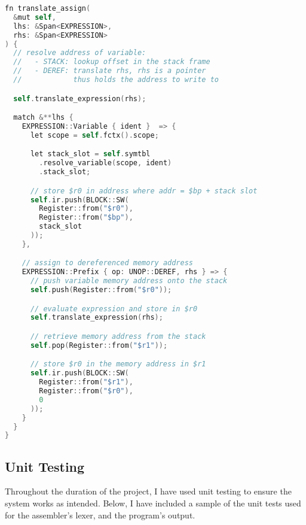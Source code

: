 \begin{lstlisting}[language=C]
fn translate_assign(
  &mut self, 
  lhs: &Span<EXPRESSION>, 
  rhs: &Span<EXPRESSION>
) {
  // resolve address of variable:
  //   - STACK: lookup offset in the stack frame
  //   - DEREF: translate rhs, rhs is a pointer 
  //            thus holds the address to write to

  self.translate_expression(rhs);

  match &**lhs {
    EXPRESSION::Variable { ident }  => {
      let scope = self.fctx().scope;

      let stack_slot = self.symtbl
        .resolve_variable(scope, ident)
        .stack_slot;

      // store $r0 in address where addr = $bp + stack slot
      self.ir.push(BLOCK::SW(
        Register::from("$r0"), 
        Register::from("$bp"), 
        stack_slot
      ));
    },

    // assign to dereferenced memory address
    EXPRESSION::Prefix { op: UNOP::DEREF, rhs } => {
      // push variable memory address onto the stack 
      self.push(Register::from("$r0"));

      // evaluate expression and store in $r0
      self.translate_expression(rhs);

      // retrieve memory address from the stack
      self.pop(Register::from("$r1"));

      // store $r0 in the memory address in $r1
      self.ir.push(BLOCK::SW(
        Register::from("$r1"),
        Register::from("$r0"), 
        0
      ));
    }
  }
}
\end{lstlisting}

\subsection{Unit Testing}
Throughout the duration of the project, I have used unit testing to ensure the system works as intended. Below, I have included a sample of the unit tests used for the assembler's lexer, and the program's output.

